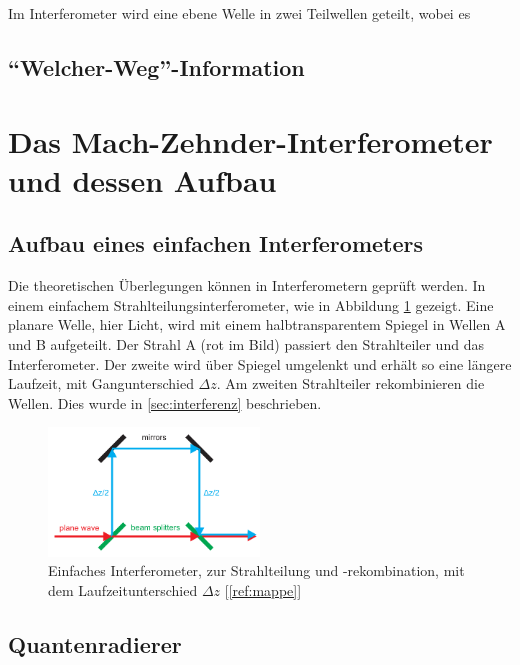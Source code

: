 \documentclass[a4paper,ngerman]{scrartcl}
\begin{document}
Im Interferometer wird eine ebene Welle in zwei Teilwellen geteilt, wobei es 



\subsection{"`Welcher-Weg"'-Information}
\label{sec:welcher-weg}


\clearpage
\section{Das Mach-Zehnder-Interferometer und dessen Aufbau}
\label{sec:mach-zehnder}

\subsection{Aufbau eines einfachen Interferometers}
\label{ssec:interferomter-einfach}

Die theoretischen Überlegungen können in Interferometern geprüft werden. In einem einfachem Strahlteilungsinterferometer, wie in Abbildung \ref{fig: Interferometer-einfach} gezeigt. Eine planare Welle, hier Licht, wird mit einem halbtransparentem Spiegel in Wellen A und B aufgeteilt. Der Strahl A (rot im Bild) passiert den Strahlteiler und das Interferometer. Der zweite wird über Spiegel umgelenkt und erhält so eine längere Laufzeit, mit Gangunterschied $\Delta z$. Am zweiten Strahlteiler rekombinieren die Wellen. Dies wurde in \ref{sec:interferenz} beschrieben.

\begin{figure}
\includegraphics[width=0.5\textwidth]{interferomter-einfach.png}
\caption{Einfaches Interferometer, zur Strahlteilung und -rekombination, mit dem Laufzeitunterschied $\Delta z$ [\ref{ref:mappe}]}
\label{fig: Interferometer-einfach}
\end{figure}

\subsection{Quantenradierer}
\label{ssec:quantenradierer}
\end{document}
